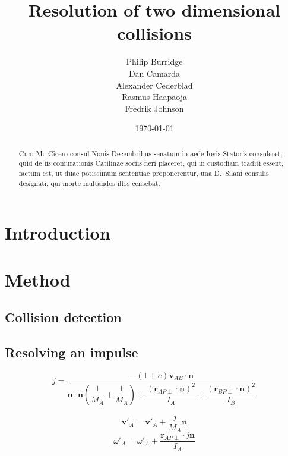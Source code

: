 \documentclass[a4paper,12pt]{report}
\title{Resolution of two dimensional collisions}
\author{Philip Burridge\\
        Dan Camarda\\
        Alexander Cederblad\\
        Rasmus Haapaoja\\
        Fredrik Johnson}
\date{\today}
\begin{document}
\maketitle


\begin{abstract}
Cum M.~Cicero consul Nonis Decembribus senatum in aede Iovis Statoris consuleret, quid de iis coniurationis Catilinae sociis fieri placeret, qui in custodiam traditi essent, factum est, ut duae potissimum sententiae proponerentur, una D.~Silani consulis designati, qui morte multandos illos censebat\cite{gdm}.
\end{abstract}


\tableofcontents


\chapter{Introduction}
\setcounter{page}{1}

\lipsum[0-2]


\chapter{Method}

\section{Collision detection}

\lipsum[0-2]

\section{Resolving an impulse}
\begin{equation}
j = \dfrac{ -(1+e) \mathbf v_{AB} \cdot \mathbf n }{
    \mathbf n \cdot \mathbf n ( \dfrac{1}{M_{A}} + \dfrac{1}{M_{A}} )
    + \dfrac{ (\mathbf r_{AP\perp} \cdot \mathbf n)^2}{I_{A} }
    + \dfrac{ (\mathbf r_{BP\perp} \cdot \mathbf n)^2}{I_{B} } }
\label{e1}
\end{equation}

\lipsum[0-1]

\begin{equation}
\mathbf v'_{A}=\mathbf v'_{A}+\frac{j}{M_{A}}\mathbf n
\label{e2}
\end{equation}
\begin{equation}
\omega'_{A}=\omega'_{A}+\frac{\mathbf r_{AP\perp}\cdot j\mathbf n}{I_{A}}
\label{e3}
\end{equation}
\end{document}
